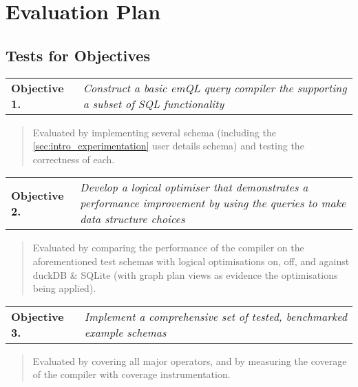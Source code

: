 \chapter{Evaluation Plan}
\section{Tests for Objectives}
\begin{tabular}{l p{}}
    \textbf{Objective 1.} & \textit{Construct a basic emQL query compiler the supporting a subset of SQL functionality}
\end{tabular}
\begin{quote}
    Evaluated by implementing several schema (including the \ref{sec:intro_experimentation} user details schema) and testing the correctness of each.
\end{quote}
\begin{tabular}{l p{}}
    \textbf{Objective 2.} & \textit{Develop a logical optimiser that demonstrates a performance improvement by using the queries to make data structure choices}
\end{tabular}
\begin{quote}
    Evaluated by comparing the performance of the compiler on the aforementioned test schemas with logical optimisations on, off, and against duckDB \& SQLite (with graph plan views as evidence the optimisations being applied).
\end{quote}
\begin{tabular}{l p{}}
    \textbf{Objective 3.} & \textit{Implement a comprehensive set of tested, benchmarked example schemas}
\end{tabular}
\begin{quote}
    Evaluated by covering all major operators, and by measuring the coverage of the compiler with coverage instrumentation.
\end{quote}